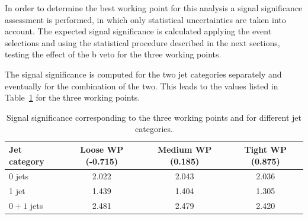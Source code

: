 In order to determine the best working point for this analysis a signal significance assessment is performed, in which only statistical uncertainties are taken into account. The expected signal significance is calculated applying the event selections and using the statistical procedure described in the next sections, testing the effect of the b veto for the three working points.

The signal significance is computed for the two jet categories separately and eventually for the combination of the two. This leads to the values listed in Table~\ref{tab:significance_wp_combine} for the three working points.

\begin{table}
\caption{Signal significance corresponding to the three working points and for
different jet categories.\label{tab:significance_wp_combine}}
\begin{center}
\begin{tabular}{lccc}
\toprule
Jet category & Loose WP (-0.715) & Medium WP (0.185) & Tight WP (0.875) \\
\midrule
0 jets & 2.022 & 2.043 & 2.036 \\
1 jet & 1.439 & 1.404 & 1.305 \\
$0+1$ jets & 2.481 & 2.479 & 2.420 \\
\bottomrule
\end{tabular}
\end{center}
\end{table}

